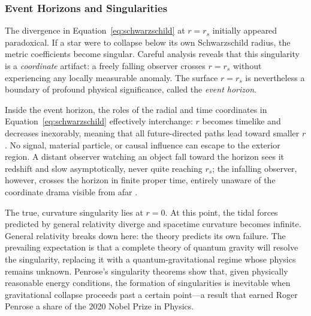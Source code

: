 \documentclass[12pt, a4paper]{article}
\begin{document}
	\subsubsection{Event Horizons and Singularities}
	
	The divergence in Equation~\eqref{eq:schwarzschild} at \(r = r_s\) initially appeared paradoxical. If a star were to collapse below its own Schwarzschild radius, the metric coefficients become singular. Careful analysis reveals that this singularity is a \textit{coordinate} artifact: a freely falling observer crosses \(r = r_s\) without experiencing any locally measurable anomaly. The surface \(r = r_s\) is nevertheless a boundary of profound physical significance, called the \textit{event horizon}.
	
	Inside the event horizon, the roles of the radial and time coordinates in Equation~\eqref{eq:schwarzschild} effectively interchange: \(r\) becomes timelike and decreases inexorably, meaning that all future-directed paths lead toward smaller \(r\). No signal, material particle, or causal influence can escape to the exterior region. A distant observer watching an object fall toward the horizon sees it redshift and slow asymptotically, never quite reaching \(r_s\); the infalling observer, however, crosses the horizon in finite proper time, entirely unaware of the coordinate drama visible from afar \citep{carrollSpacetimeGeometryIntroduction2019}.
	
	The true, curvature singularity lies at \(r = 0\). At this point, the tidal forces predicted by general relativity diverge and spacetime curvature becomes infinite. General relativity breaks down here: the theory predicts its own failure. The prevailing expectation is that a complete theory of quantum gravity will resolve the singularity, replacing it with a quantum-gravitational regime whose physics remains unknown. Penrose's singularity theorems show that, given physically reasonable energy conditions, the formation of singularities is inevitable when gravitational collapse proceeds past a certain point---a result that earned Roger Penrose a share of the 2020 Nobel Prize in Physics.
	
\end{document}

